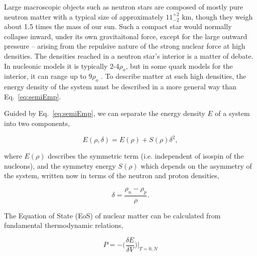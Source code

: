 Large macroscopic objects such as neutron stars are composed of mostly pure neutron matter \cite{neutronstar} with a typical size of approximately $11^{+2}_{-2}$ \si{\kilo\metre}, though they weigh about 1.5 times the mass of our sun. Such a compact star would normally collapse inward, under its own gravitaitonal force, except for the large outward pressure -- arising from the repulsive nature of the strong nuclear force at high densities.  The densities reached in a neutron star's interior is a matter of debate. In nucleonic models it is typically 2-4$\rho_o$, but in some quark models for the interior, it can range up to  9$\rho_o$ \cite{neutronstar}. To describe matter at such high densities, the energy density of the system must be described in a more general way than Eq.~\ref{eq:semiEmp}.




Guided by Eq.~\ref{eq:semiEmp}, we can separate the energy density $E$ of a system into two components,

\begin{equation}
E(\rho,\delta) = E(\rho	) + S(\rho)\delta^2,
\label{eq:energyEos}
\end{equation}

where $E(\rho)$ describes the symmetric term (i.e. independent of isospin of the nucleons), and the symmetry energy $S(\rho)$ which depends on the asymmetry of the system, written now in terms of the neutron and proton densities, 

\begin{equation}
\delta = \frac{\rho_n - \rho_p}{\rho}.
\label{eq:asym}
\end{equation}

The Equation of State (EoS) of nuclear matter can be calculated from fundamental thermodynamic relations, 

\begin{equation}
P = -\Big(\frac{\delta E}{\delta V}\Big)\vert_{T=0,N}
\label{eq:pressEos}
\end{equation}

